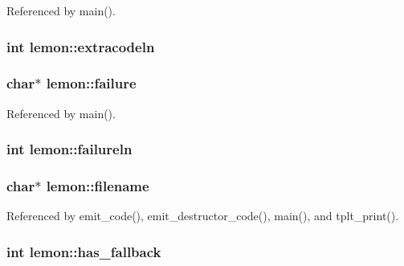 Referenced by main().

\hypertarget{structlemon_ab9289aa74679e3a53540eefebd30484e}{
\subsubsection[{extracodeln}]{\setlength{\rightskip}{0pt plus 5cm}int lemon\-::extracodeln}}\label{structlemon_ab9289aa74679e3a53540eefebd30484e}
\hypertarget{structlemon_a2c5a51191c4df555486145f8d4a2d655}{
\subsubsection[{failure}]{\setlength{\rightskip}{0pt plus 5cm}char$\ast$ lemon\-::failure}}\label{structlemon_a2c5a51191c4df555486145f8d4a2d655}


Referenced by main().

\hypertarget{structlemon_a1dca070f96c372bb30989cfc29b59485}{
\subsubsection[{failureln}]{\setlength{\rightskip}{0pt plus 5cm}int lemon\-::failureln}}\label{structlemon_a1dca070f96c372bb30989cfc29b59485}
\hypertarget{structlemon_a2b5f99613de48854dc417a6ad07efc71}{
\subsubsection[{filename}]{\setlength{\rightskip}{0pt plus 5cm}char$\ast$ lemon\-::filename}}\label{structlemon_a2b5f99613de48854dc417a6ad07efc71}


Referenced by emit\-\_\-code(), emit\-\_\-destructor\-\_\-code(), main(), and tplt\-\_\-print().

\hypertarget{structlemon_ab293971f89301abe2caef589f8c2e259}{
\subsubsection[{has\-\_\-fallback}]{\setlength{\rightskip}{0pt plus 5cm}int lemon\-::has\-\_\-fallback}}\label{structlemon_ab293971f89301abe2caef589f8c2e259}


